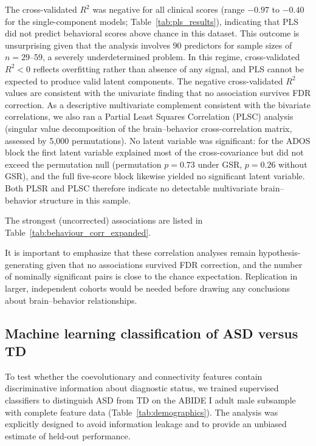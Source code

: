 \documentclass[10pt,letterpaper]{article}
\begin{document}
The cross-validated $R^2$ was negative for all clinical scores (range $-0.97$ to $-0.40$ for the
single-component models; Table~\ref{tab:pls_results}), indicating that PLS did not predict
behavioral scores above chance in this dataset. This outcome is unsurprising given that the
analysis involves 90 predictors for sample sizes of $n = 29$--59, a severely underdetermined
problem. In this regime, cross-validated $R^2 < 0$ reflects overfitting rather than absence of
any signal, and PLS cannot be expected to produce valid latent components. The negative cross-validated
$R^2$ values are consistent with the univariate finding that no association survives FDR correction.
As a descriptive multivariate complement consistent with the bivariate correlations, we also ran a
Partial Least Squares Correlation (PLSC) analysis \cite{Krishnan2011} (singular value decomposition
of the brain--behavior cross-correlation matrix, assessed by 5{,}000 permutations). No latent
variable was significant: for the ADOS block the first latent variable explained most of the
cross-covariance but did not exceed the permutation null (permutation $p = 0.73$ under GSR,
$p = 0.26$ without GSR), and the full five-score block likewise yielded no significant latent
variable. Both PLSR and PLSC therefore indicate no detectable multivariate brain--behavior structure
in this sample.



The strongest (uncorrected) associations are listed in Table~\ref{tab:behaviour_corr_expanded}.

It is important to emphasize that these correlation analyses remain hypothesis-generating given that
no associations survived FDR correction, and the number of nominally significant pairs is close to
the chance expectation. Replication in larger, independent cohorts would be needed before drawing
any conclusions about brain--behavior relationships.



\subsection*{Machine learning classification of ASD versus TD}

To test whether the coevolutionary and connectivity features contain discriminative information
about diagnostic status, we trained supervised classifiers to distinguish ASD from TD on the ABIDE I
adult male subsample with complete feature data (Table~\ref{tab:demographics}). The analysis was
explicitly designed to avoid information leakage and to provide an unbiased estimate of held-out
performance.
\end{document}
